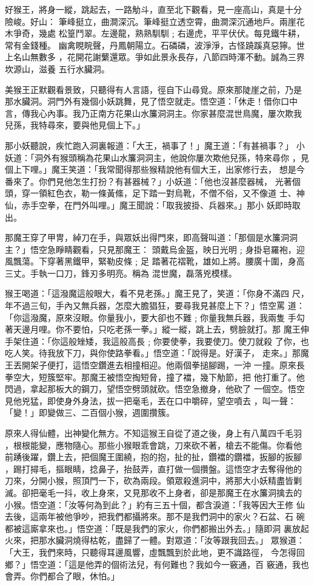 \begin{pinyinscope}
{好猴王，將身一縱，跳起去，一路觔斗，直至北下觀看，見一座高山，真是十分
險峻。好山：
筆峰挺立，曲澗深沉。筆峰挺立透空霄，曲澗深沉通地戶。兩崖花木爭奇，幾處
松篁鬥翠。左邊龍，熟熟馴馴﹔右邊虎，平平伏伏。每見鐵牛耕，常有金錢種。
幽禽睍睆聲，丹鳳朝陽立。石磷磷，波淨淨，古怪蹺蹊真惡獰。世上名山無數多
，花開花謝蘩還眾。爭如此景永長存，八節四時渾不動。誠為三界坎源山，滋養
五行水臟洞。

美猴王正默觀看景致，只聽得有人言語，徑自下山尋覓。原來那陡崖之前，乃是
那水臟洞。洞門外有幾個小妖跳舞，見了悟空就走。悟空道：「休走！借你口中
言，傳我心內事。我乃正南方花果山水簾洞洞主。你家甚麼混世鳥魔，屢次欺我
兒孫，我特尋來，要與他見個上下。」

那小妖聽說，疾忙跑入洞裏報道：「大王，禍事了！」魔王道：「有甚禍事？」
小妖道：「洞外有猴頭稱為花果山水簾洞洞主，他說你屢次欺他兒孫，特來尋你
，見個上下哩。」魔王笑道：「我常聞得那些猴精說他有個大王，出家修行去，
想是今番來了。你們見他怎生打扮？有甚器械？」小妖道：「他也沒甚麼器械，
光著個頭，穿一領紅色衣，勒一條黃絛，足下踏一對烏靴，不僧不俗，又不像道
士、神仙，赤手空拳，在門外叫哩。」魔王聞說：「取我披掛、兵器來。」那小
妖即時取出。

那魔王穿了甲冑，綽刀在手，與眾妖出得門來，即高聲叫道：「那個是水簾洞洞
主？」悟空急睜睛觀看，只見那魔王：
頭戴烏金盔，映日光明﹔身掛皂羅袍，迎風飄蕩。下穿著黑鐵甲，緊勒皮條﹔足
踏著花褶靴，雄如上將。腰廣十圍，身高三丈。手執一口刀，鋒刃多明亮。稱為
混世魔，磊落兇模樣。


猴王喝道：「這潑魔這般眼大，看不見老孫。」魔王見了，笑道：「你身不滿四
尺，年不過三旬，手內又無兵器，怎麼大膽猖狂，要尋我見甚麼上下？」悟空罵
道：「你這潑魔，原來沒眼。你量我小，要大卻也不難﹔你量我無兵器，我兩隻
手勾著天邊月哩。你不要怕，只吃老孫一拳。」縱一縱，跳上去，劈臉就打。那
魔王伸手架住道：「你這般矬矮，我這般高長﹔你要使拳，我要使刀。使刀就殺
了你，也吃人笑。待我放下刀，與你使路拳看。」悟空道：「說得是。好漢子，
走來。」那魔王丟開架子便打，這悟空鑽進去相撞相迎。他兩個拳搥腳踢，一沖
一撞。原來長拳空大，短簇堅牢。那魔王被悟空掏短脅，撞了襠，幾下觔節，把
他打重了。他閃過，拿起那板大的鋼刀，望悟空劈頭就砍。悟空急撤身，他砍了
一個空。悟空見他兇猛，即使身外身法，拔一把毫毛，丟在口中嚼碎，望空噴去
，叫一聲：「變！」即變做三、二百個小猴，週圍攢簇。

原來人得仙體，出神變化無方。不知這猴王自從了道之後，身上有八萬四千毛羽
，根根能變，應物隨心。那些小猴眼乖會跳，刀來砍不著，槍去不能傷。你看他
前踴後躍，鑽上去，把個魔王圍繞，抱的抱，扯的扯，鑽襠的鑽襠，扳腳的扳腳
，踢打撏毛，摳眼睛，捻鼻子，抬鼓弄，直打做一個攢盤。這悟空才去奪得他的
刀來，分開小猴，照頂門一下，砍為兩段。領眾殺進洞中，將那大小妖精盡皆剿
滅。卻把毫毛一抖，收上身來，又見那收不上身者，卻是那魔王在水簾洞擒去的
小猴。悟空道：「汝等何為到此？」約有三五十個，都含淚道：「我等因大王修
仙去後，這兩年被他爭吵，把我們都攝將來。那不是我們洞中的家火？石盆、石
碗都被這廝拿來也。」悟空道：「既是我們的家火，你們都搬出外去。」隨即洞
裏放起火來，把那水臟洞燒得枯乾，盡歸了一體。對眾道：「汝等跟我回去。」
眾猴道：「大王，我們來時，只聽得耳邊風響，虛飄飄到於此地，更不識路徑，
今怎得回鄉？」悟空道：「這是他弄的個術法兒，有何難也？我如今一竅通，百
竅通，我也會弄。你們都合了眼，休怕。」

}
\end{pinyinscope}
